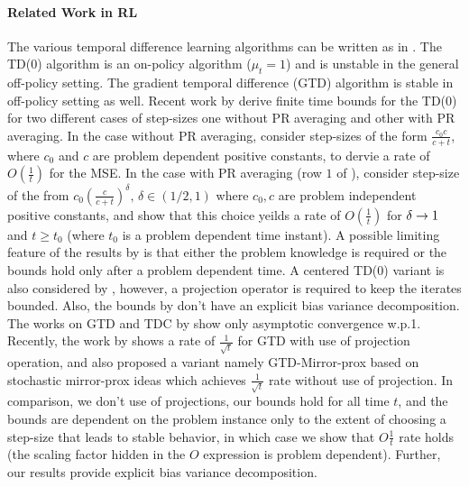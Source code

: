 \paragraph{Related Work in RL} The various temporal difference learning algorithms can be written as in . The TD(0) algorithm is an on-policy algorithm ($\mu_t=1$) and is unstable in the general {off-policy} setting. The gradient temporal difference (GTD) algorithm \cite{gtd,gtd2,gtdmp} is stable in off-policy setting as well. Recent work by \cite{korda-prashanth} derive finite time bounds for the TD(0) for two different cases of step-sizes one without PR averaging and other with PR averaging. In the case without PR averaging, \cite{korda-prashanth} consider step-sizes of the form $\frac{c_0c}{c+t}$, where $c_0$ and $c$ are problem dependent positive constants, to dervie a rate of $O(\frac{1}{t})$ for the MSE.  In the case with PR averaging (row $1$ of ), \cite{korda-prashanth} consider step-size of the from $c_0\left(\frac{c}{c+t}\right)^\delta,\,\delta \in (1/2,1)$ where $c_0, c$ are problem independent positive constants, and show that this choice yeilds a rate of $O(\frac{1}{t})$ for $\delta \rightarrow 1$ and $t\geq t_0$ (where $t_0$ is a problem dependent time instant). A possible limiting feature of the results by \cite{korda-prashanth} is that either the problem knowledge is required or the bounds hold only after a problem dependent time. A centered TD(0) variant is also considered by \cite{korda-prashanth}, however, a projection operator is required to keep the iterates bounded. Also, the bounds by \cite{korda-prashanth} don't have an explicit bias variance decomposition. The works on GTD and TDC by \cite{gtd,gtd2} show only asymptotic convergence w.p.1. Recently, the work by \cite{gtdmp} shows a rate of $\frac{1}{\sqrt{t}}$ for GTD with use of projection operation, and also proposed a variant namely GTD-Mirror-prox based on stochastic mirror-prox ideas which achieves $\frac{1}{\sqrt{t}}$ rate without use of projection. In comparison, we don't use of projections, our bounds hold for all time $t$, and the bounds are dependent on the problem instance only to the extent of choosing a step-size that leads to stable behavior, in which case we show that $O\frac{1}{t}$ rate holds (the scaling factor hidden in the $O$ expression is problem dependent). Further, our results provide explicit bias variance decomposition.
